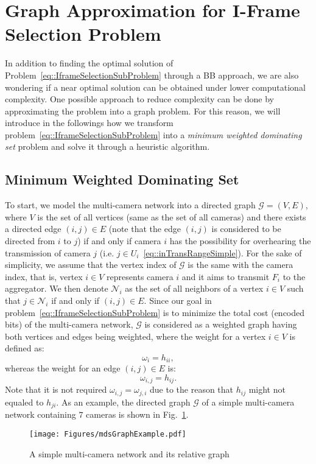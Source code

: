 \section{Graph Approximation for I-Frame Selection Problem}
\label{sec::graphApprox}
In addition to finding the optimal solution of Problem~\eqref{eq::IframeSelectionSubProblem} through a BB approach, we are also wondering if a near optimal solution can be obtained under lower computational complexity.
One possible approach to reduce complexity can be done by approximating the problem into a graph problem.
For this reason, we will introduce in the followings how we transform problem~\eqref{eq::IframeSelectionSubProblem} into a \emph{minimum weighted dominating set} problem and solve it through a heuristic algorithm.
%
\subsection{Minimum Weighted Dominating Set}
To start, we model the multi-camera network into a directed graph $\mathcal{G}=(V,E)$, where $V$ is the set of all vertices (same as the set of all cameras) and there exists a directed edge $(i,j) \in E$ (note that the edge $(i,j)$ is considered to be directed from $i$ to $j$) if and only if camera $i$ has the possibility for overhearing the transmission of camera $j$ (i.e. $j \in U_i$~\eqref{eq::inTransRangeSimple}).
For the sake of simplicity, we assume that the vertex index of $\mathcal{G}$ is the same with the camera index, that is, vertex $i \in V$ represents camera $i$ and it aims to transmit $F_i$ to the aggregator.
We then denote $\mathcal{N}_i$ as the set of all neighbors of a vertex $i \in V$ such that $j \in \mathcal{N}_i$ if and only if $(i,j) \in E$.
Since our goal in problem~\eqref{eq::IframeSelectionSubProblem} is to minimize the total cost (encoded bits) of the multi-camera network, $\mathcal{G}$ is considered as a weighted graph having both vertices and edges being weighted, where the weight for a vertex $i \in V$ is defined as:
\begin{equation}
\omega_i = h_{ii},
\end{equation}
whereas the weight for an edge $(i,j) \in E$ is:
\begin{equation}
\omega_{i,j} = h_{ij}.
\end{equation}
Note that it is not required $\omega_{i,j} = \omega_{j,i}$ due to the reason that $h_{ij}$ might not equaled to $h_{ji}$.
As an example, the directed graph $\mathcal{G}$ of a simple multi-camera network containing $7$ cameras is shown in Fig.~\ref{fig::mdsGraphExample}.
%
\begin{figure}
\begin{center}
\texttt{[image: Figures/mdsGraphExample.pdf]}
\caption{\label{fig::mdsGraphExample}A simple multi-camera network and its relative graph}
\end{center}
\end{figure}
%

